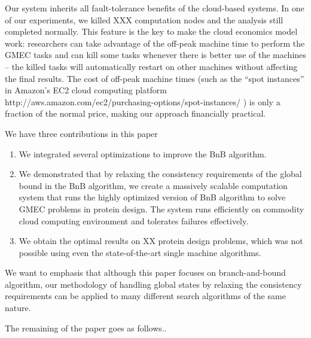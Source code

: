 Our system inherits all fault-tolerance benefits of the cloud-based systems. In
one of our experiments, we killed XXX computation nodes and the analysis still
completed normally. This feature is the key to make the cloud economics model
work: researchers can take advantage of the off-peak machine time to perform the
GMEC tasks and can kill some tasks whenever there is better use of the machines
– the killed tasks will automatically restart on other machines without
affecting the final results. The cost of off-peak machine times (such as the
“spot instances” in Amazon’s EC2 cloud computing platform~\cite[]{}
http://aws.amazon.com/ec2/purchasing-options/spot-instances/ ) is only a
fraction of the normal price, making our approach financially practical.

We have three contributions in this paper

\begin{enumerate}
  \item We integrated several optimizations to improve the BnB algorithm. 

  \item We demonstrated that by relaxing the consistency requirements of the global
bound in the BnB algorithm, we create a massively scalable computation system
that runs the highly optimized version of BnB algorithm to solve GMEC problems
in protein design. The system runs efficiently on commodity cloud computing
environment and tolerates failures effectively.

  \item We obtain the optimal results on XX protein design problems, which was not
possible using even the state-of-the-art single machine algorithms. 

\end{enumerate}

We want to emphasis that although this paper focuses on branch-and-bound
algorithm, our methodology of handling global states by relaxing the consistency
requirements can be applied to many different search algorithms of the same
nature.

The remaining of the paper goes as follows..
